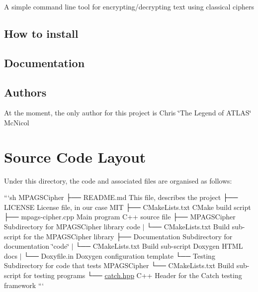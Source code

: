 A simple command line tool for encrypting/decrypting text using classical ciphers

\subsection*{How to install}

\subsection*{Documentation}

\subsection*{Authors}

At the moment, the only author for this project is Chris \char`\"{}\-The Legend of A\-T\-L\-A\-S\char`\"{} Mc\-Nicol

\section*{Source Code Layout}

Under this directory, the code and associated files are organised as follows\-:

```sh M\-P\-A\-G\-S\-Cipher ├── R\-E\-A\-D\-M\-E.\-md This file, describes the project ├── L\-I\-C\-E\-N\-S\-E License file, in our case M\-I\-T ├── C\-Make\-Lists.\-txt C\-Make build script ├── mpags-\/cipher.\-cpp Main program C++ source file ├── M\-P\-A\-G\-S\-Cipher Subdirectory for M\-P\-A\-G\-S\-Cipher library code $\vert$ └── C\-Make\-Lists.\-txt Build sub-\/script for the M\-P\-A\-G\-S\-Cipher library ├── Documentation Subdirectory for documentation \char`\"{}code\char`\"{} $\vert$ └── C\-Make\-Lists.\-txt Build sub-\/script Doxygen H\-T\-M\-L docs $\vert$ └── Doxyfile.\-in Doxygen configuration template └── Testing Subdirectory for code that tests M\-P\-A\-G\-S\-Cipher └── C\-Make\-Lists.\-txt Build sub-\/script for testing programs └── \hyperlink{catch_8hpp_source}{catch.\-hpp} C++ Header for the Catch testing framework ``` 